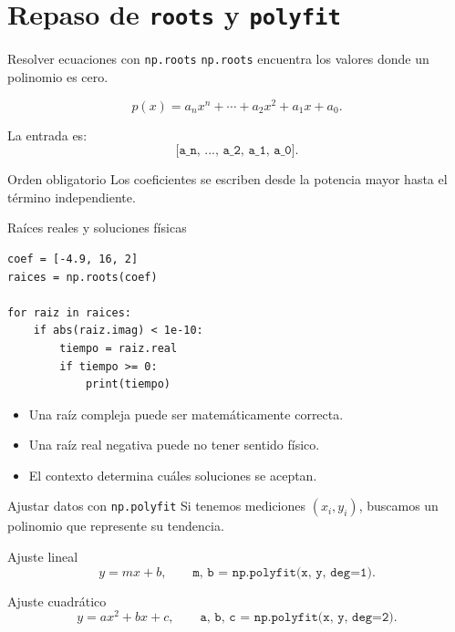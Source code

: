 \documentclass[10pt]{beamer}
\begin{document}
\section{Repaso de \texttt{roots} y \texttt{polyfit}}

\begin{frame}{Resolver ecuaciones con \texttt{np.roots}}
  \texttt{np.roots} encuentra los valores donde un polinomio es cero.

  \[
    p(x)=a_nx^n+\cdots+a_2x^2+a_1x+a_0.
  \]

  La entrada es:
  \[
    \texttt{[a\_n, ..., a\_2, a\_1, a\_0]}.
  \]

  \begin{alertblock}{Orden obligatorio}
    Los coeficientes se escriben desde la potencia mayor hasta el término independiente.
  \end{alertblock}
\end{frame}

\begin{frame}[fragile]{Raíces reales y soluciones físicas}
\begin{verbatim}
coef = [-4.9, 16, 2]
raices = np.roots(coef)

for raiz in raices:
    if abs(raiz.imag) < 1e-10:
        tiempo = raiz.real
        if tiempo >= 0:
            print(tiempo)
\end{verbatim}

  \begin{itemize}
    \item Una raíz compleja puede ser matemáticamente correcta.
    \item Una raíz real negativa puede no tener sentido físico.
    \item El contexto determina cuáles soluciones se aceptan.
  \end{itemize}
\end{frame}

\begin{frame}{Ajustar datos con \texttt{np.polyfit}}
  Si tenemos mediciones \((x_i,y_i)\), buscamos un polinomio que represente su tendencia.

  \begin{block}{Ajuste lineal}
    \[
      y=mx+b,
      \qquad
      \texttt{m, b = np.polyfit(x, y, deg=1)}.
    \]
  \end{block}

  \begin{block}{Ajuste cuadrático}
    \[
      y=ax^2+bx+c,
      \qquad
      \texttt{a, b, c = np.polyfit(x, y, deg=2)}.
    \]
  \end{block}
\end{frame}
\end{document}
